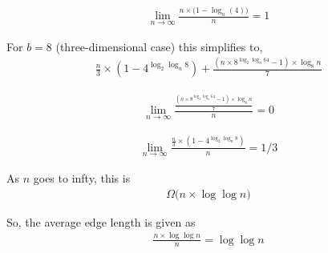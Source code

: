 \begin{align*}
\lim_{n \rightarrow \infty} \frac{n \times \Big( 1 - \log_n(4) \Big)}{n} = 1
\end{align*}

For $b = 8$ (three-dimensional case) this simplifies to,
\begin{align*}
\frac{n}{3}
\times (1 - 4^{ \log_2 \log_n 8 })
+
\frac{
  (
    n \times 8^{
      \log_2 \log_n 64
    } - 1
  ) \times \log_8 n
}{7}
\end{align*}

\begin{align*}
\lim_{n \rightarrow \infty}
\frac{\frac{ (n \times 8^{ \log_2 \log_n 64 } - 1) \times \log_8 n }{7}}{n} = 0
\end{align*}

\begin{align*}
\lim_{n \rightarrow \infty}
\frac{\frac{n}{3} \times (1 - 4^{ \log_2 \log_n 8 })}{n} = 1/3
\end{align*}

As $n$ goes to infty, this is
\begin{align*}
\Omega \Big( n \times \log \log n \Big)
\end{align*}

So, the average edge length is given as
\begin{align*}
\frac{n \times \log \log n}{n} = \log \log n
\end{align*}
